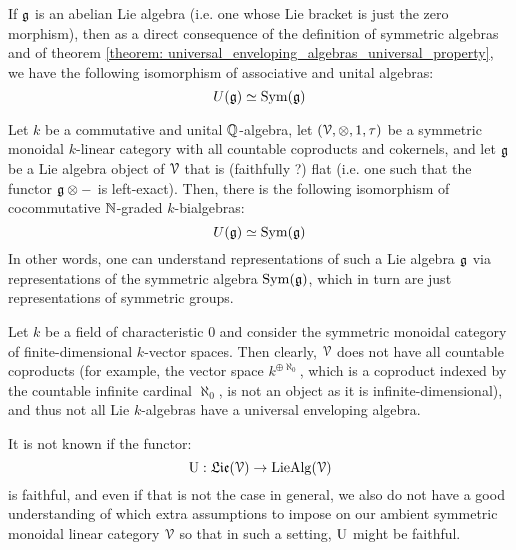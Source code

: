         \begin{example}
            If $\mathfrak{g}$ is an abelian Lie algebra (i.e. one whose Lie bracket is just the zero morphism), then as a direct consequence of the definition of symmetric algebras and of theorem \ref{theorem: universal_enveloping_algebras_universal_property}, we have the following isomorphism of associative and unital algebras:
                $$U(\mathfrak{g}) \simeq \mathrm{Sym}(\mathfrak{g})$$
        \end{example}
        \begin{example}
            Let $k$ be a commutative and unital $\mathbb{Q}$-algebra, let $(\calV, \tensor, 1, \tau)$ be a symmetric monoidal $k$-linear category with all countable coproducts and cokernels, and let $\mathfrak{g}$ be a Lie algebra object of $\mathcal{V}$ that is (faithfully ?) flat (i.e. one such that the functor $\g \tensor -$ is left-exact). Then, there is the following isomorphism of cocommutative $\mathbb{N}$-graded $k$-bialgebras:
                $$U(\mathfrak{g}) \simeq \mathrm{Sym}(\mathfrak{g})$$
            In other words, one can understand representations of such a Lie algebra $\mathfrak{g}$ via representations of the symmetric algebra $\mathrm{Sym}(\mathfrak{g})$, which in turn are just representations of symmetric groups.
        \end{example}
        \begin{example}
            Let $k$ be a field of characteristic $0$ and consider the symmetric monoidal category of finite-dimensional $k$-vector spaces. Then clearly, $\mathcal{V}$ does not have all countable coproducts (for example, the vector space $k^{\oplus \aleph_0}$, which is a coproduct indexed by the countable infinite cardinal $\aleph_0$, is not an object as it is infinite-dimensional), and thus not all Lie $k$-algebras have a universal enveloping algebra.
        \end{example}
        \begin{example}
            It is not known if the functor:
                $$\mathrm{U}: \mathfrak{Lie}(\mathcal{V}) \to \mathrm{Lie}\mathrm{Alg}(\mathcal{V})$$
            is faithful, and even if that is not the case in general, we also do not have a good understanding of which extra assumptions to impose on our ambient symmetric monoidal linear category $\mathcal{V}$ so that in such a setting, $\mathrm{U}$ might be faithful. 
        \end{example}
        
